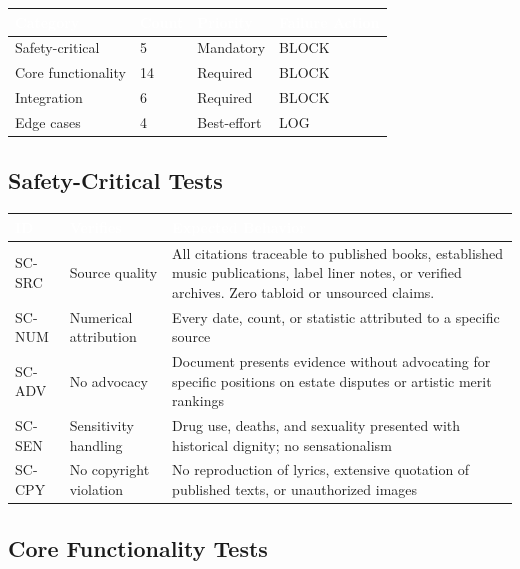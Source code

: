\documentclass[11pt,letterpaper]{article}
\newcommand{\tableheader}[1]{\textbf{\sffamily\textcolor{white}{#1}}}
\begin{document}
\begin{center}
\begin{tabularx}{\textwidth}{L{3cm}C{1.5cm}C{1.5cm}X}
\toprule
{}
\tableheader{Category} & \tableheader{Count} & \tableheader{Priority} & \tableheader{Failure Action} \\
\midrule
Safety-critical & 5 & Mandatory & BLOCK \\
Core functionality & 14 & Required & BLOCK \\
Integration & 6 & Required & BLOCK \\
Edge cases & 4 & Best-effort & LOG \\
\bottomrule
\end{tabularx}
\end{center}

\subsection{Safety-Critical Tests}

\begin{center}
\begin{tabularx}{\textwidth}{C{1.2cm}L{3.5cm}X}
\toprule
{}
\tableheader{ID} & \tableheader{Verifies} & \tableheader{Expected Behavior} \\
\midrule
SC-SRC & Source quality & All citations traceable to published books, established music publications, label liner notes, or verified archives. Zero tabloid or unsourced claims. \\
SC-NUM & Numerical attribution & Every date, count, or statistic attributed to a specific source \\
SC-ADV & No advocacy & Document presents evidence without advocating for specific positions on estate disputes or artistic merit rankings \\
SC-SEN & Sensitivity handling & Drug use, deaths, and sexuality presented with historical dignity; no sensationalism \\
SC-CPY & No copyright violation & No reproduction of lyrics, extensive quotation of published texts, or unauthorized images \\
\bottomrule
\end{tabularx}
\end{center}

\subsection{Core Functionality Tests}
\end{document}
